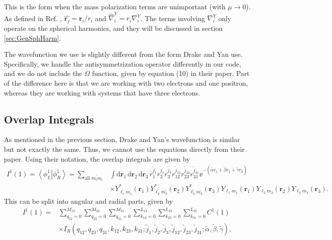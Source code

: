 \documentclass[Dissertation.tex]{subfiles}
\begin{document}
\noindent This is the form when the mass polarization terms are unimportant (with $\mu \rightarrow 0$). As defined in Ref. \cite{Yan1997}, $\hat{\boldsymbol{r}_j} = \boldsymbol{r}_i/r_i$ and $\hat{\nabla}_i^Y = r_i \nabla_i^Y$. The terms involving $\nabla_i^Y$ only operate on the spherical harmonics, and they will be discussed in section \ref{sec:GenSphHarm}.

The wavefunction we use is slightly different from the form Drake and Yan use. Specifically, we handle the antisymmetrization operator differently in our code, and we do not include the $\Omega$ function, given by equation (10) in their paper. Part of the difference here is that we are working with two electrons and one positron, whereas they are working with systems that have three electrons.

\subsection{Overlap Integrals}
\label{sec:GenOverlap}
As mentioned in the previous section, Drake and Yan's wavefunction is similar but not exactly the same. Thus, we cannot use the equations directly from their paper. Using their notation, the overlap integrals are given by
\begin{align}
\nonumber I^1(1) = \left< \phi_L^1 \left| \phi_R^1 \right. \right> = \sum_{\text{all } m_i^\prime m_i} & \int \mathrm{d}\boldsymbol{r}_1 \, \mathrm{d}\boldsymbol{r}_2 \, \mathrm{d}\boldsymbol{r}_3 \, r_1^{\tilde{j}_1} r_2^{\tilde{j}_2} r_3^{\tilde{j}_3} r_{12}^{\tilde{j}_{12}} r_{23}^{\tilde{j}_{23}} r_{31}^{\tilde{j}_{31}} \ee^{-(\tilde{\alpha} r_1 + \tilde{\beta} r_2 + \tilde{\gamma} r_3)} \\
& \times Y_{\ell_1^\prime m_1^\prime}^* (\boldsymbol{r}_1) Y_{\ell_2^\prime m_2^\prime}^* (\boldsymbol{r}_2) Y_{\ell_3^\prime m_3^\prime}^* (\boldsymbol{r}_3) Y_{\ell_1 m_1} (\boldsymbol{r}_1) Y_{\ell_2 m_2} (\boldsymbol{r}_2) Y_{\ell_3 m_3} (\boldsymbol{r}_3).
\end{align}
This can be split into angular and radial parts, given by
\begin{align}
\nonumber I^1(1) = & \sum_{q_{12}=0}^{M_{12}} \sum_{q_{23}=0}^{M_{23}} \sum_{q_{31}=0}^{M_{31}} \sum_{k_{12}=0}^{L_{12}} \sum_{k_{23}=0}^{L_{23}} \sum_{k_{31}=0}^{L_{31}} C^1(1) \\
& \times I_R \left(q_{12}, q_{23}, q_{31}, k_{12}, k_{23}, k_{31}; \tilde{j}_1, \tilde{j}_2, \tilde{j}_3, \tilde{j}_{12}, \tilde{j}_{23}, \tilde{j}_{31}; \tilde{\alpha}, \tilde{\beta}, \tilde{\gamma} \right),
\end{align}
\end{document}
